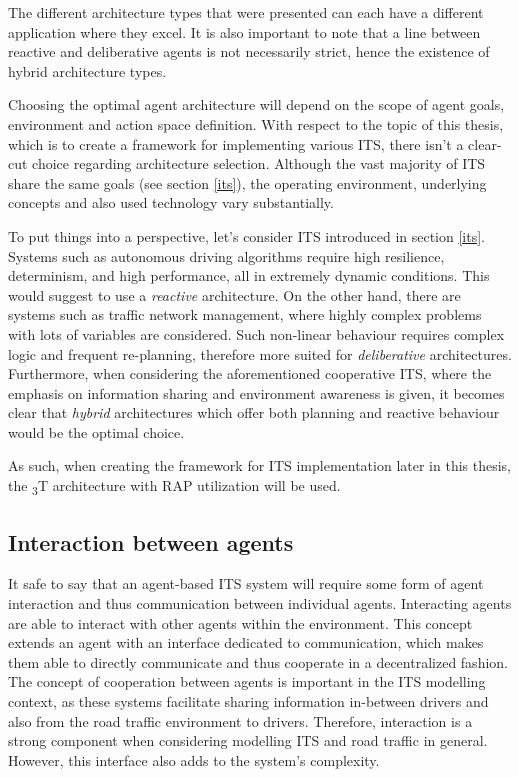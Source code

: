 \documentclass[main.tex]{subfiles}
\begin{document}
The different architecture types that were presented can each have a different application where 
they excel. It is also important to note that a line between reactive and deliberative agents 
is not necessarily strict, hence the existence of hybrid architecture types. 

Choosing the optimal agent architecture will depend on the scope of agent goals, 
environment and action space definition. With respect to the topic of this thesis, which is to 
create a framework for implementing various ITS, there isn't a clear-cut choice regarding 
architecture selection. Although the vast majority of ITS share the same goals (see section \ref{its}), 
the operating environment, underlying concepts and also used technology vary substantially.

To put things into a perspective, let's consider ITS introduced in section \ref{its}. 
Systems such as autonomous driving algorithms require high resilience, determinism, 
and high performance, all in extremely dynamic conditions. This would suggest to use a
\emph{reactive} architecture. On the other hand, there are systems such as traffic network management, 
where highly complex problems with lots of variables are considered. Such non-linear behaviour 
requires complex logic and frequent re-planning, therefore more suited for \emph{deliberative}
architectures. Furthermore, when considering the aforementioned cooperative ITS, where the emphasis 
on information sharing and environment awareness is given, it becomes clear that \emph{hybrid} 
architectures which offer both planning and reactive behaviour would be the optimal choice.

As such, when creating the framework for ITS implementation later in this thesis, the
\textsubscript{3}T architecture with RAP utilization will be used.  

\subsection{Interaction between agents}

It safe to say that an agent-based ITS system will require some form of agent interaction and
thus communication between individual agents. Interacting agents are able to interact with
other agents within the environment. This concept extends an agent with an interface dedicated
to communication, which makes them able to directly communicate and thus cooperate in a
decentralized fashion.  The concept of cooperation between agents is important in the ITS
modelling context, as these systems facilitate sharing information in-between drivers and also
from the road traffic environment to drivers. Therefore, interaction is a strong component when
considering modelling ITS and road traffic in general. However, this interface also adds to the
system's complexity.
\end{document}
